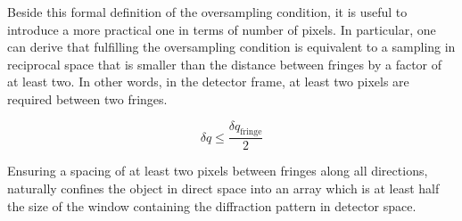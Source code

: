 Beside this formal definition of the oversampling condition, it is useful to introduce a more practical one in terms of 
number of pixels. In particular, one can derive that fulfilling the oversampling condition is equivalent to a sampling 
in reciprocal space that is smaller than the distance between fringes by a factor of at least two. In other words, 
in the detector frame, at least two pixels are required between two fringes. 

\begin{equation}
    \delta q \leq \frac{\delta q_{\text{fringe}}}{2}
\end{equation}

Ensuring a spacing of at least two pixels between fringes along all directions, naturally confines the 
object in direct space into an array which is at least half the size of the window containing 
the diffraction pattern in detector space. 

